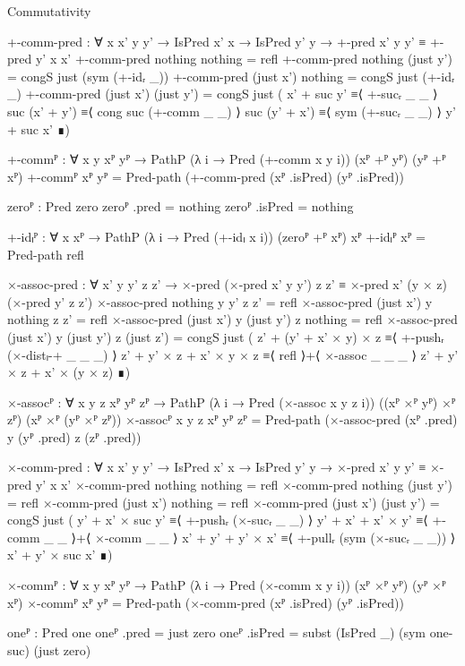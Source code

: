 Commutativity
\begin{code}
  +-comm-pred :
    ∀ {x x' y y'} → IsPred x' x → IsPred y' y →
    +-pred x' y y' ≡ +-pred y' x x'
  +-comm-pred nothing    nothing    = refl
  +-comm-pred nothing    (just y')  =
    congS just (sym (+-idᵣ _))
  +-comm-pred (just x')  nothing    =
    congS just (+-idᵣ _)
  +-comm-pred (just x')  (just y')  =
    congS just
      (  x' + suc y'    ≡⟨ +-sucᵣ _ _ ⟩
         suc (x' + y')  ≡⟨ cong suc (+-comm _ _) ⟩
         suc (y' + x')  ≡⟨ sym (+-sucᵣ _ _) ⟩
         y' + suc x'    ∎)
\end{code}
\begin{code}[hide]
  +-commᴾ :
    ∀ {x y} xᴾ yᴾ → PathP (λ i → Pred (+-comm x y i)) (xᴾ +ᴾ yᴾ) (yᴾ +ᴾ xᴾ)
  +-commᴾ xᴾ yᴾ = Pred-path (+-comm-pred (xᴾ .isPred) (yᴾ .isPred))

  zeroᴾ : Pred zero
  zeroᴾ .pred = nothing
  zeroᴾ .isPred = nothing

  +-idₗᴾ : ∀ {x} xᴾ → PathP (λ i → Pred (+-idₗ x i)) (zeroᴾ +ᴾ xᴾ) xᴾ
  +-idₗᴾ xᴾ = Pred-path refl

  ×-assoc-pred :
    ∀ x' y y' z z' →
    ×-pred (×-pred x' y y') z z' ≡ ×-pred x' (y × z) (×-pred y' z z')
  ×-assoc-pred nothing y y' z z' = refl
  ×-assoc-pred (just x') y nothing z z' = refl
  ×-assoc-pred (just x') y (just y') z nothing = refl
  ×-assoc-pred (just x') y (just y') z (just z') =
    congS just
      ( z' + (y' + x' × y) × z     ≡⟨ +-pushᵣ (×-distₗ-+ _ _ _) ⟩
        z' + y' × z + x' × y × z   ≡⟨ refl ⟩+⟨ ×-assoc _ _ _ ⟩
        z' + y' × z + x' × (y × z) ∎)

  ×-assocᴾ : ∀ {x y z} xᴾ yᴾ zᴾ →
    PathP (λ i → Pred (×-assoc x y z i)) ((xᴾ ×ᴾ yᴾ) ×ᴾ zᴾ) (xᴾ ×ᴾ (yᴾ ×ᴾ zᴾ))
  ×-assocᴾ {x} {y} {z} xᴾ yᴾ zᴾ =
    Pred-path (×-assoc-pred (xᴾ .pred) y (yᴾ .pred) z (zᴾ .pred))

  ×-comm-pred :
    ∀ {x x' y y'} → IsPred x' x → IsPred y' y →
    ×-pred x' y y' ≡ ×-pred y' x x'
  ×-comm-pred nothing nothing = refl
  ×-comm-pred nothing (just y') = refl
  ×-comm-pred (just x') nothing = refl
  ×-comm-pred (just x') (just y') =
    congS just
      ( y' + x' × suc y'   ≡⟨ +-pushᵣ (×-sucᵣ _ _) ⟩
        y' + x' + x' × y' ≡⟨ +-comm _ _ ⟩+⟨ ×-comm _ _ ⟩
        x' + y' + y' × x' ≡⟨ +-pullᵣ (sym (×-sucᵣ _ _)) ⟩
        x' + y' × suc x' ∎)

  ×-commᴾ :
    ∀ {x y} xᴾ yᴾ → PathP (λ i → Pred (×-comm x y i)) (xᴾ ×ᴾ yᴾ) (yᴾ ×ᴾ xᴾ)
  ×-commᴾ xᴾ yᴾ = Pred-path (×-comm-pred (xᴾ .isPred) (yᴾ .isPred))

  oneᴾ : Pred one
  oneᴾ .pred = just zero
  oneᴾ .isPred = subst (IsPred _) (sym one-suc) (just zero)


\end{code}
